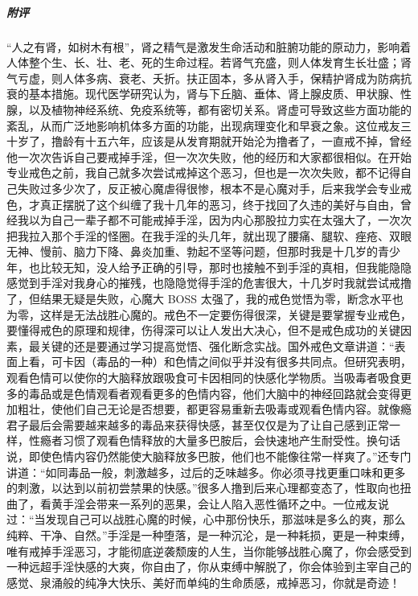 \begin{case}
    \subparagraph{附评} “人之有肾，如树木有根”，肾之精气是激发生命活动和脏腑功能的原动力，影响着人体整个生、长、壮、老、死的生命过程。若肾气充盛，则人体发育生长壮盛；肾气亏虚，则人体多病、衰老、夭折。扶正固本，多从肾入手，保精护肾成为防病抗衰的基本措施。现代医学研究认为，肾与下丘脑、垂体、肾上腺皮质、甲状腺、性腺，以及植物神经系统、免疫系统等，都有密切关系。肾虚可导致这些方面功能的紊乱，从而广泛地影响机体多方面的功能，出现病理变化和早衰之象。这位戒友三十岁了，撸龄有十五六年，应该是从发育期就开始沦为撸者了，一直戒不掉，曾经他一次次告诉自己要戒掉手淫，但一次次失败，他的经历和大家都很相似。在开始专业戒色之前，我自己就多次尝试戒掉这个恶习，但也是一次次失败，都不记得自己失败过多少次了，反正被心魔虐得很惨，根本不是心魔对手，后来我学会专业戒色，才真正摆脱了这个纠缠了我十几年的恶习，终于找回了久违的美好与自由，曾经我以为自己一辈子都不可能戒掉手淫，因为内心那股拉力实在太强大了，一次次把我拉入那个手淫的怪圈。在我手淫的头几年，就出现了腰痛、腿软、痤疮、双眼无神、慢前、脑力下降、鼻炎加重、勃起不坚等问题，但那时我是十几岁的青少年，也比较无知，没人给予正确的引导，那时也接触不到手淫的真相，但我能隐隐感觉到手淫对我身心的摧残，也隐隐觉得手淫的危害很大，十几岁时我就尝试戒撸了，但结果无疑是失败，心魔大 BOSS 太强了，我的戒色觉悟为零，断念水平也为零，这样是无法战胜心魔的。戒色不一定要伤得很深，关键是要掌握专业戒色，要懂得戒色的原理和规律，伤得深可以让人发出大决心，但不是戒色成功的关键因素，最关键的还是要通过学习提高觉悟、强化断念实战。国外戒色文章讲道：“表面上看，可卡因（毒品的一种）和色情之间似乎并没有很多共同点。但研究表明，观看色情可以使你的大脑释放跟吸食可卡因相同的快感化学物质。当吸毒者吸食更多的毒品或是色情观看者观看更多的色情内容，他们大脑中的神经回路就会变得更加粗壮，使他们自己无论是否想要，都更容易重新去吸毒或观看色情内容。就像瘾君子最后会需要越来越多的毒品来获得快感，甚至仅仅是为了让自己感到正常一样，性瘾者习惯了观看色情释放的大量多巴胺后，会快速地产生耐受性。换句话说，即使色情内容仍然能使大脑释放多巴胺，他们也不能像往常一样爽了。”还专门讲道：“如同毒品一般，刺激越多，过后的乏味越多。你必须寻找更重口味和更多的刺激，以达到以前初尝禁果的快感。”很多人撸到后来心理都变态了，性取向也扭曲了，看黄手淫会带来一系列的恶果，会让人陷入恶性循环之中。一位戒友说过：“当发现自己可以战胜心魔的时候，心中那份快乐，那滋味是多么的爽，那么纯粹、干净、自然。”手淫是一种堕落，是一种沉沦，是一种耗损，更是一种束缚，唯有戒掉手淫恶习，才能彻底逆袭颓废的人生，当你能够战胜心魔了，你会感受到一种远超手淫快感的大爽，你自由了，你从束缚中解脱了，你会体验到主宰自己的感觉、泉涌般的纯净大快乐、美好而单纯的生命质感，戒掉恶习，你就是奇迹！
\end{case}

